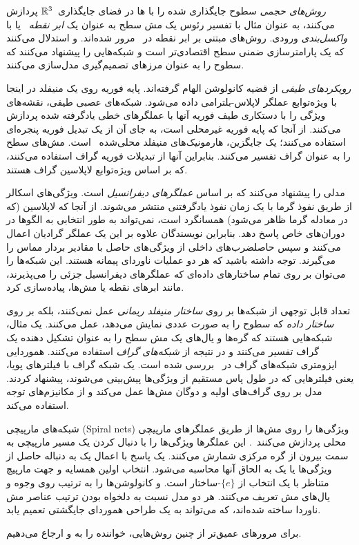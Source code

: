\emph{روش‌های حجمی} سطوح جایگذاری شده را با ها در فضای جایگذاری~$\mathbb{R}^3$ پردازش می‌کنند، به عنوان مثال با تفسیر رئوس یک مش سطح به عنوان یک \emph{ابر نقطه}~\cite{qi2017pointnet,qi2017pointnet++,thomas2019kpconv} یا با \emph{واکسل‌بندی} ورودی.
روش‌های مبتنی بر ابر نقطه در~\cite{guo2020deep} مرور شده‌اند.
\citet{mescheder2019occupancyNets} و \citet{peng2020occupancyCNNs} استدلال می‌کنند که یک پارامترسازی ضمنی سطح اقتصادی‌تر است و شبکه‌هایی را پیشنهاد می‌کنند که سطوح را به عنوان مرزهای تصمیم‌گیری مدل‌سازی می‌کنند.


\emph{رویکردهای طیفی} از قضیه کانولوشن الهام گرفته‌اند.
پایه فوریه روی یک منیفلد در اینجا با ویژه‌توابع عملگر لاپلاس-بلترامی داده می‌شود.
شبکه‌های عصبی طیفی، نقشه‌های ویژگی را با دستکاری طیف فوریه آنها با عملگرهای خطی یادگرفته شده پردازش می‌کنند.
از آنجا که پایه فوریه غیرمحلی است، \citet{boscaini2015learning} به جای آن از یک تبدیل فوریه پنجره‌ای استفاده می‌کنند؛ یک جایگزین، هارمونیک‌های منیفلد محلی‌شده~\citet{melzi2018localized} است.
\citet{bruna2013spectral} مش‌های سطح را به عنوان گراف تفسیر می‌کنند.
بنابراین آنها از تبدیلات فوریه گراف استفاده می‌کنند، که بر اساس ویژه‌توابع لاپلاسین گراف هستند.


\citet{sharp2020diffusion} مدلی را پیشنهاد می‌کنند که بر اساس \emph{عملگرهای دیفرانسیل} است.
ویژگی‌های اسکالر از طریق نفوذ گرما با یک زمان نفوذ یادگرفتنی منتشر می‌شوند.
از آنجا که لاپلاسین (که در معادله گرما ظاهر می‌شود) همسانگرد است، نمی‌تواند به طور انتخابی به الگوها در دوران‌های خاص پاسخ دهد.
بنابراین نویسندگان علاوه بر این یک عملگر گرادیان اعمال می‌کنند و سپس حاصلضرب‌های داخلی از ویژگی‌های حاصل با مقادیر بردار مماس را می‌گیرند.
توجه داشته باشید که هر دو عملیات ناوردای پیمانه هستند.
این شبکه‌ها را می‌توان بر روی تمام ساختارهای داده‌ای که عملگرهای دیفرانسیل جزئی را می‌پذیرند، مانند ابرهای نقطه یا مش‌ها، پیاده‌سازی کرد.


تعداد قابل توجهی از شبکه‌ها بر روی \emph{ساختار منیفلد ریمانی} عمل نمی‌کنند، بلکه بر روی \emph{ساختار داده} که سطوح را به صورت عددی نمایش می‌دهد، عمل می‌کنند.
یک مثال، شبکه‌هایی هستند که گره‌ها و یال‌های یک مش سطح را به عنوان تشکیل دهنده یک گراف تفسیر می‌کنند و در نتیجه از \emph{شبکه‌های گراف} استفاده می‌کنند.
هموردایی ایزومتری شبکه‌های گراف در~\cite{khasanova2018isometric,horie2020isometric} بررسی شده است.
\citet{verma2018feastnet} یک شبکه گراف با فیلترهای پویا، یعنی فیلترهایی که در طول پاس مستقیم از ویژگی‌ها پیش‌بینی می‌شوند، پیشنهاد کردند.
مدل \citet{milano2020primaldual} بر روی گراف‌های اولیه و دوگان مش‌ها عمل می‌کند و از مکانیزم‌های توجه استفاده می‌کند.

شبکه‌های مارپیچی (Spiral nets) ویژگی‌ها را روی مش‌ها از طریق عملگرهای مارپیچی محلی پردازش می‌کنند~\cite{lim2018simple,gong2019spiralnet++}.
این عملگرها ویژگی‌ها را با دنبال کردن یک مسیر مارپیچی به سمت بیرون از گره مرکزی شمارش می‌کنند.
یک پاسخ با اعمال یک  به دنباله حاصل از ویژگی‌ها یا یک  به الحاق آنها محاسبه می‌شود.
انتخاب اولین همسایه و جهت مارپیچ متناظر با یک انتخاب از $\{e\}$-ساختار است.
\citet{hanocka2019meshcnn} و \citet{hertz2020GeomTextureSynthesis} کانولوشن‌ها را به ترتیب روی وجوه و یال‌های مش تعریف می‌کنند.
هر دو مدل نسبت به دلخواه بودن ترتیب عناصر مش ناوردا ساخته شده‌اند، که می‌تواند به یک طراحی هموردای جایگشتی تعمیم یابد.

برای مرورهای عمیق‌تر از چنین روش‌هایی، خواننده را به \citet{bronstein2017geometric} و \citet{guo2020deep} ارجاع می‌دهیم.